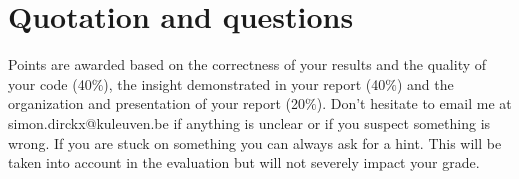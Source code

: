 \documentclass[12pt]{article}
\begin{document}
\section{Quotation and questions}
Points are awarded based on the correctness of your results and the quality of your code (40$\%$),
the insight demonstrated in your report (40$\%$) and the organization and presentation of your report
(20$\%$). Don’t hesitate to email me at simon.dirckx@kuleuven.be if anything is unclear or if you suspect
something is wrong. If you are stuck on something you can always ask for a hint. This will be taken
into account in the evaluation but will not severely impact your grade.
\end{document}
